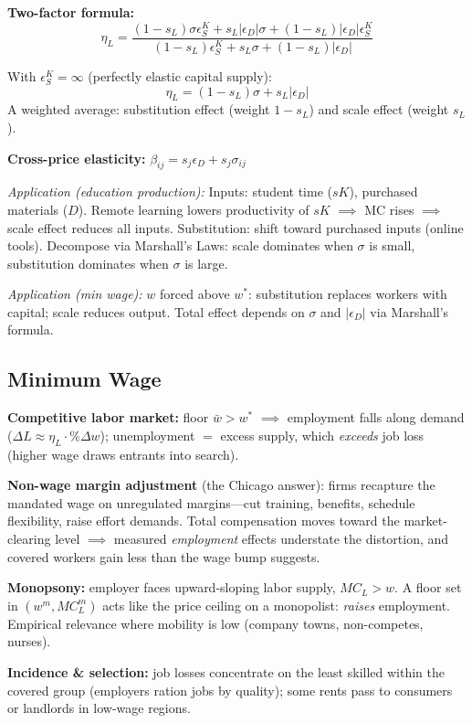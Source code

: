 \textbf{Two-factor formula:}
$$\eta_L = \frac{(1-s_L)\sigma\epsilon_S^K + s_L|\epsilon_D|\sigma + (1-s_L)|\epsilon_D|\epsilon_S^K}{(1-s_L)\epsilon_S^K + s_L\sigma + (1-s_L)|\epsilon_D|}$$

With $\epsilon_S^K = \infty$ (perfectly elastic capital supply):
$$\eta_L = (1-s_L)\sigma + s_L|\epsilon_D|$$
A weighted average: substitution effect (weight $1-s_L$) and scale effect (weight $s_L$).

\textbf{Cross-price elasticity:}
$\beta_{ij} = s_j\epsilon_D + s_j\sigma_{ij}$

\textit{Application (education production):} Inputs: student time ($sK$), purchased materials ($D$). Remote learning lowers productivity of $sK$ $\implies$ MC rises $\implies$ scale effect reduces all inputs. Substitution: shift toward purchased inputs (online tools). Decompose via Marshall's Laws: scale dominates when $\sigma$ is small, substitution dominates when $\sigma$ is large.

\textit{Application (min wage):} $w$ forced above $w^*$: substitution replaces workers with capital; scale reduces output. Total effect depends on $\sigma$ and $|\epsilon_D|$ via Marshall's formula.

\subsection{Minimum Wage}
\textbf{Competitive labor market:} floor $\bar w > w^*$ $\implies$ employment falls along demand ($\Delta L \approx \eta_L \cdot \% \Delta w$); unemployment $=$ excess supply, which \textit{exceeds} job loss (higher wage draws entrants into search).

\textbf{Non-wage margin adjustment} (the Chicago answer): firms recapture the mandated wage on unregulated margins---cut training, benefits, schedule flexibility, raise effort demands. Total compensation moves toward the market-clearing level $\implies$ measured \textit{employment} effects understate the distortion, and covered workers gain less than the wage bump suggests.

\textbf{Monopsony:} employer faces upward-sloping labor supply, $MC_L > w$. A floor set in $(w^m, MC_L^m)$ acts like the price ceiling on a monopolist: \textit{raises} employment. Empirical relevance where mobility is low (company towns, non-competes, nurses).

\textbf{Incidence \& selection:} job losses concentrate on the least skilled within the covered group (employers ration jobs by quality); some rents pass to consumers or landlords in low-wage regions.


